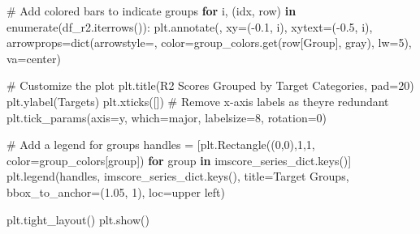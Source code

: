\documentclass[
  letterpaper,
  DIV=11,
  numbers=noendperiod]{scrartcl}
\newenvironment{Shaded}{\begin{snugshade}}{\end{snugshade}}
\newcommand{\BuiltInTok}[1]{\textcolor[rgb]{0.00,0.23,0.31}{#1}}
\newcommand{\CommentTok}[1]{\textcolor[rgb]{0.37,0.37,0.37}{#1}}
\newcommand{\ControlFlowTok}[1]{\textcolor[rgb]{0.00,0.23,0.31}{\textbf{#1}}}
\newcommand{\DecValTok}[1]{\textcolor[rgb]{0.68,0.00,0.00}{#1}}
\newcommand{\FloatTok}[1]{\textcolor[rgb]{0.68,0.00,0.00}{#1}}
\newcommand{\KeywordTok}[1]{\textcolor[rgb]{0.00,0.23,0.31}{\textbf{#1}}}
\newcommand{\NormalTok}[1]{\textcolor[rgb]{0.00,0.23,0.31}{#1}}
\newcommand{\OperatorTok}[1]{\textcolor[rgb]{0.37,0.37,0.37}{#1}}
\newcommand{\StringTok}[1]{\textcolor[rgb]{0.13,0.47,0.30}{#1}}
\begin{document}
\begin{Shaded}
\begin{Highlighting}[]
\CommentTok{\# Add colored bars to indicate groups}
\ControlFlowTok{for}\NormalTok{ i, (idx, row) }\KeywordTok{in} \BuiltInTok{enumerate}\NormalTok{(df\_r2.iterrows()):}
\NormalTok{    plt.annotate(}\StringTok{\textquotesingle{}\textquotesingle{}}\NormalTok{, xy}\OperatorTok{=}\NormalTok{(}\OperatorTok{{-}}\FloatTok{0.1}\NormalTok{, i), xytext}\OperatorTok{=}\NormalTok{(}\OperatorTok{{-}}\FloatTok{0.5}\NormalTok{, i),}
\NormalTok{                 arrowprops}\OperatorTok{=}\BuiltInTok{dict}\NormalTok{(arrowstyle}\OperatorTok{=}\StringTok{\textquotesingle{}{-}\textquotesingle{}}\NormalTok{, color}\OperatorTok{=}\NormalTok{group\_colors.get(row[}\StringTok{\textquotesingle{}Group\textquotesingle{}}\NormalTok{], }\StringTok{\textquotesingle{}gray\textquotesingle{}}\NormalTok{),}
\NormalTok{                                 lw}\OperatorTok{=}\DecValTok{5}\NormalTok{),}
\NormalTok{                 va}\OperatorTok{=}\StringTok{\textquotesingle{}center\textquotesingle{}}\NormalTok{)}

\CommentTok{\# Customize the plot}
\NormalTok{plt.title(}\StringTok{\textquotesingle{}R2 Scores Grouped by Target Categories\textquotesingle{}}\NormalTok{, pad}\OperatorTok{=}\DecValTok{20}\NormalTok{)}
\NormalTok{plt.ylabel(}\StringTok{\textquotesingle{}Targets\textquotesingle{}}\NormalTok{)}
\NormalTok{plt.xticks([])  }\CommentTok{\# Remove x{-}axis labels as they\textquotesingle{}re redundant}
\NormalTok{plt.tick\_params(axis}\OperatorTok{=}\StringTok{\textquotesingle{}y\textquotesingle{}}\NormalTok{, which}\OperatorTok{=}\StringTok{\textquotesingle{}major\textquotesingle{}}\NormalTok{, labelsize}\OperatorTok{=}\DecValTok{8}\NormalTok{, rotation}\OperatorTok{=}\DecValTok{0}\NormalTok{)}

\CommentTok{\# Add a legend for groups}
\NormalTok{handles }\OperatorTok{=}\NormalTok{ [plt.Rectangle((}\DecValTok{0}\NormalTok{,}\DecValTok{0}\NormalTok{),}\DecValTok{1}\NormalTok{,}\DecValTok{1}\NormalTok{, color}\OperatorTok{=}\NormalTok{group\_colors[group]) }\ControlFlowTok{for}\NormalTok{ group }\KeywordTok{in}\NormalTok{ imscore\_series\_dict.keys()]}
\NormalTok{plt.legend(handles, imscore\_series\_dict.keys(), title}\OperatorTok{=}\StringTok{\textquotesingle{}Target Groups\textquotesingle{}}\NormalTok{, }
\NormalTok{           bbox\_to\_anchor}\OperatorTok{=}\NormalTok{(}\FloatTok{1.05}\NormalTok{, }\DecValTok{1}\NormalTok{), loc}\OperatorTok{=}\StringTok{\textquotesingle{}upper left\textquotesingle{}}\NormalTok{)}

\NormalTok{plt.tight\_layout()}
\NormalTok{plt.show()}
\end{Highlighting}
\end{Shaded}
\end{document}
